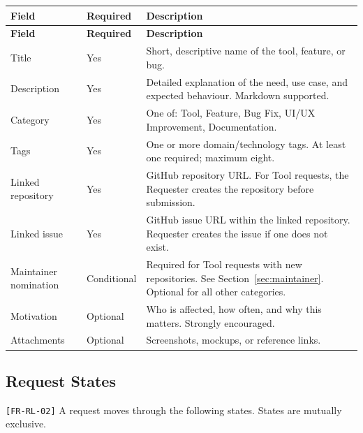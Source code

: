\documentclass[12pt,a4paper]{article}
\begin{document}
\begin{longtable}{L{3cm} L{2cm} L{8.3cm}}
  \color{white}\bfseries Field & \color{white}\bfseries Required & \color{white}\bfseries Description \\
  \endfirsthead
  \color{white}\bfseries Field & \color{white}\bfseries Required & \color{white}\bfseries Description \\
  \endhead\hline
  Title             & Yes      & Short, descriptive name of the tool, feature, or bug. \\
  Description       & Yes      & Detailed explanation of the need, use case, and expected behaviour. Markdown supported. \\
  Category          & Yes      & One of: Tool, Feature, Bug Fix, UI/UX Improvement, Documentation. \\
  Tags              & Yes      & One or more domain/technology tags. At least one required; maximum eight. \\
  Linked repository & Yes      & GitHub repository URL. For Tool requests, the Requester creates the repository before submission. \\
  Linked issue      & Yes      & GitHub issue URL within the linked repository. Requester creates the issue if one does not exist. \\
  Maintainer nomination & Conditional & Required for Tool requests with new repositories. See Section~\ref{sec:maintainer}. Optional for all other categories. \\
  Motivation        & Optional & Who is affected, how often, and why this matters. Strongly encouraged. \\
  Attachments       & Optional & Screenshots, mockups, or reference links. \\
  \hline
\end{longtable}

\subsection{Request States}
\texttt{[FR-RL-02]} A request moves through the following states. States are mutually exclusive.
\end{document}
